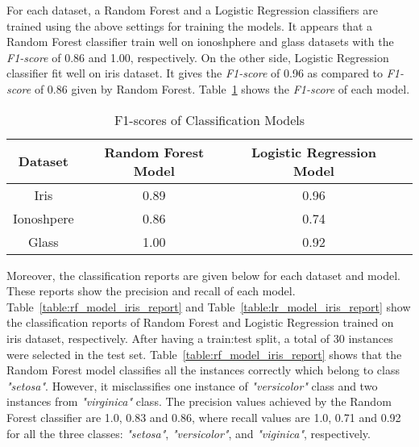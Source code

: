 \documentclass[english]{tktltiki2}
\theoremstyle{definition}
\theoremstyle{remark}
\begin{document}
For each dataset, a Random Forest and a Logistic Regression classifiers are trained using the above settings for training the models. It appears that a Random Forest classifier train well on ionoshphere and glass datasets with the \textit{F1-score} of 0.86 and 1.00, respectively. On the other side, Logistic Regression classifier fit well on iris dataset. It gives the \textit{F1-score} of 0.96 as compared to \textit{F1-score} of 0.86 given by Random Forest. Table~\ref{table:training_models_F1_score_datasets_UCI} shows the \textit{F1-score} of each model.

\begin{table}[H]
	\caption{F1-scores of Classification Models}
	\label{table:training_models_F1_score_datasets_UCI}
	\begin{center}
		\begin{tabular}{@{}cccc@{}}
			\toprule
			Dataset & Random Forest Model & Logistic Regression Model \\ \hline
			
			\multicolumn{1}{|c|}{Iris} & \multicolumn{1}{c|}{0.89} & \multicolumn{1}{c|}{0.96} \\ \hline
			
			\multicolumn{1}{|c|}{Ionoshpere} & \multicolumn{1}{c|}{0.86} & \multicolumn{1}{c|}{0.74} \\ \hline
			
			\multicolumn{1}{|c|}{Glass} & \multicolumn{1}{c|}{1.00} & \multicolumn{1}{c|}{0.92} \\ \hline
			
		\end{tabular}
	\end{center}
\end{table}



Moreover, the classification reports are given below for each dataset and model. These reports show the precision and recall of each model.
Table~\ref{table:rf_model_iris_report} and Table~\ref{table:lr_model_iris_report} show the classification reports of Random Forest and Logistic Regression trained on iris dataset, respectively. After having a train:test split, a total of 30 instances were selected in the test set. Table~\ref{table:rf_model_iris_report} shows that the Random Forest model classifies all the instances correctly which belong to class \textit{"setosa"}. However, it misclassifies one instance of \textit{"versicolor"} class and two instances from \textit{"virginica"} class. The precision values achieved by the Random Forest classifier are 1.0, 0.83 and 0.86, where recall values are 1.0, 0.71 and 0.92 for all the three classes: \textit{"setosa"}, \textit{"versicolor"}, and \textit{"viginica"}, respectively.  
\end{document}
